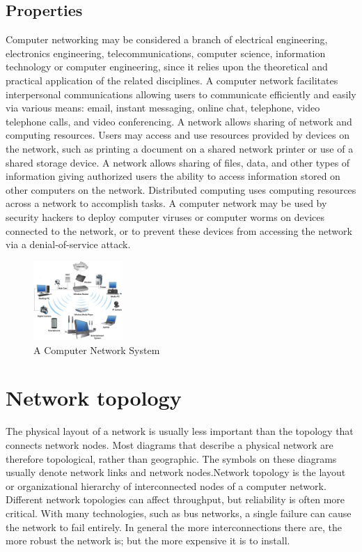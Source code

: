 \documentclass{article}
\begin{document}
\subsection{Properties}
Computer networking may be considered a branch of electrical engineering, electronics engineering, telecommunications, computer science, information technology or computer engineering, since it relies upon the theoretical and practical application of the related disciplines.
A computer network facilitates interpersonal communications allowing users to communicate efficiently and easily via various means: email, instant messaging, online chat, telephone, video telephone calls, and video conferencing. A network allows sharing of network and computing resources. Users may access and use resources provided by devices on the network, such as printing a document on a shared network printer or use of a shared storage device. A network allows sharing of files, data, and other types of information giving authorized users the ability to access information stored on other computers on the network. Distributed computing uses computing resources across a network to accomplish tasks.
A computer network may be used by security hackers to deploy computer viruses or computer worms on devices connected to the network, or to prevent these devices from accessing the network via a denial-of-service attack.
\begin{figure}[h]
\includegraphics[width=0.9\linewidth, height=3cm]{networking-sub.png}
\caption*{A Computer Network System}
\end{figure}
\newpage
\section{Network topology}
The physical layout of a network is usually less important than the topology that connects network nodes. Most diagrams that describe a physical network are therefore topological, rather than geographic. The symbols on these diagrams usually denote network links and network nodes.Network topology is the layout or organizational hierarchy of interconnected nodes of a computer network. Different network topologies can affect throughput, but reliability is often more critical. With many technologies, such as bus networks, a single failure can cause the network to fail entirely. In general the more interconnections there are, the more robust the network is; but the more expensive it is to install.
\end{document}
